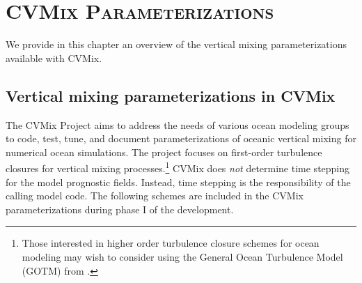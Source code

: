 \chapter{\scshape CVMix Parameterizations}
\label{chapter:cvmix_intro}

\minitoc
\vspace{.5cm}

We provide in this chapter an overview of the vertical mixing
parameterizations available with CVMix.


\section{Vertical mixing parameterizations in CVMix}
\label{section:vert_mix_schemes_cvmix}

The CVMix Project aims to address the needs of various ocean modeling
groups to code, test, tune, and document parameterizations of oceanic
vertical mixing for numerical ocean simulations.  The project focuses
on first-order turbulence closures for vertical mixing
processes.\footnote{Those interested in higher order turbulence
  closure schemes for ocean modeling may wish to consider using the
  General Ocean Turbulence Model (GOTM) from \cite{GOTM}.}  CVMix does
{\it not} determine time stepping for the model prognostic fields.
Instead, time stepping is the responsibility of the calling model
code.  The following schemes are included in the CVMix
parameterizations during phase I of the development.

